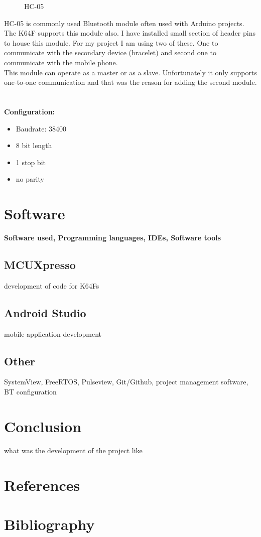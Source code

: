 \documentclass[12pt,a4paper]{article}
\begin{document}
\begin{figure}
			\caption[HC-05 Bluetooth module]{HC-05}
		\end{figure}

		HC-05 is commonly used Bluetooth module often used with Arduino projects. The K64F supports  
		this module also. I have installed small section of header pins to house this module. For my  
		project I am using two of these. One to communicate with the secondary device (bracelet) and  
		second one to communicate with the mobile phone.\\
		
		This module can operate as a master or as a slave. Unfortunately it only supports one-to-one  
		communication and that was the reason for adding the second module.\\\\\\
		
		{\bfseries Configuration:}
		\begin{itemize}
			\item Baudrate: 38400
			\item 8 bit length
			\item 1 stop bit
			\item no parity

		\end{itemize}
		\newpage
	
	
	
	\section{Software}
	{\bfseries Software used, Programming languages, IDEs, Software tools}\\
	
		\subsection{MCUXpresso}
		development of code for K64Fs
		\newpage
	
		\subsection{Android Studio}
		mobile application development
		\newpage
		
		\subsection{Other}
		SystemView, FreeRTOS, Pulseview, Git/Github, project management software, BT configuration
		\newpage
	
	\section{Conclusion}
	what was the development of the project like
	\newpage
	
	\section{References}
	\newpage
	
	\section{Bibliography}
	\newpage
	
	\listoffigures
	
\end{document}
